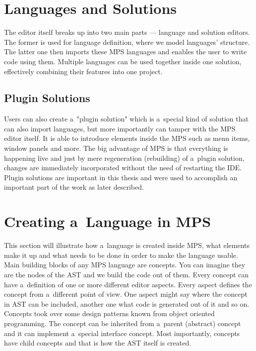 \section{Languages and Solutions}

The editor itself breaks up into two main parts --- language and solution editors.
The former is used for language definition, where we model languages' structure.
The latter one then imports these MPS languages and enables the user to write code using them.
Multiple languages can be used together inside one solution, effectively combining their features into one project.

\subsection{Plugin Solutions}

Users can also create a~"plugin solution" which is a~special kind of solution that can also import languages, but more importantly can tamper with the MPS editor itself.
It is able to introduce elements inside the MPS such as menu items, window panels and more.
The big advantage of MPS is that everything is happening live and just by mere regeneration (rebuilding) of a~plugin solution, changes are immediately incorporated without the need of restarting the IDE.
Plugin solutions are important in this thesis and were used to accomplish an important part of the work as later described.

\section{Creating a~Language in MPS}

This section will illustrate how a~language is created inside MPS, what elements make it up and what needs to be done in order to make the language usable.
\\

Main building blocks of any MPS language are concepts.
You can imagine they are the nodes of the AST and we build the code out of them.
Every concept can have a~definition of one or more different editor aspects.
Every aspect defines the concept from a~different point of view.
One aspect might say where the concept in AST can be included, another one what code is generated out of it and so on.
Concepts took over some design patterns known from object oriented programming.
The concept can be inherited from a~parent (abstract) concept and it can implement a~special interface concept.
Most importantly, concepts have child concepts and that is how the AST itself is created.
\\

